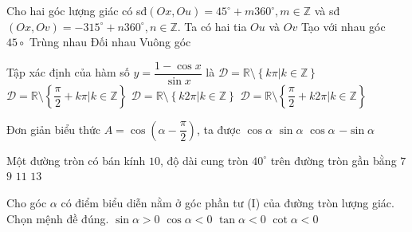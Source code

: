 \begin{ex}%
Cho hai góc lượng giác có sđ$(Ox,Ou)=45^\circ+m360^\circ, m\in \mathbb{Z}$ và sđ$(Ox,Ov)=-315^\circ+n360^\circ, n\in \mathbb{Z}$. Ta có hai tia $Ou$ và $Ov$
\choice
{Tạo với nhau góc $45\circ$}
{\True Trùng nhau}
{Đối nhau}
{Vuông góc}
\end{ex}

\begin{ex}%
Tập xác định của hàm số $y=\dfrac{1-\cos x}{\sin x}$ là
\choice
{\True $\mathscr{D}=\mathbb{R}\setminus\left\{ k\pi |k\in\mathbb{Z}\right\}$}
{$\mathscr{D}=\mathbb{R}\setminus\left\{\dfrac{\pi}{2}+k\pi |k\in\mathbb{Z}\right\}$}
{$\mathscr{D}=\mathbb{R}\setminus\left\{ k2\pi |k\in\mathbb{Z}\right\}$}
{$\mathscr{D}=\mathbb{R}\setminus\left\{\dfrac{\pi}{2}+k2\pi |k\in\mathbb{Z}\right\}$}
\end{ex}

\begin{ex}%
Đơn giản biểu thức $A=\cos \left( \alpha -\dfrac{\pi }{2} \right)$, ta được
\choice
{ $\cos \alpha $}
{\True $\sin \alpha $}
{ $\cos \alpha $}
{ $-\sin \alpha $}
\end{ex}

\begin{ex}%
Một đường tròn có bán kính $10$, độ dài cung tròn $40^\circ$ trên đường tròn gần bằng
\choice
{\True $7$}
{$9$}
{$11$}
{$13$}
\loigiai{
\[l=\dfrac{\pi a\cdot R}{180}=\dfrac{\pi \cdot 40\cdot 10}{180}=\dfrac{20\pi }{9}\approx 7.\] }
\end{ex}

\begin{ex}%
Cho góc $\alpha$ có điểm biểu diễn nằm ở góc phần tư (I) của đường tròn lượng giác. Chọn mệnh đề đúng.
\choice
{\True $\sin \alpha >0$}
{$\cos \alpha <0$}
{$\tan \alpha <0$}
{$\cot \alpha <0$}
\end{ex}

